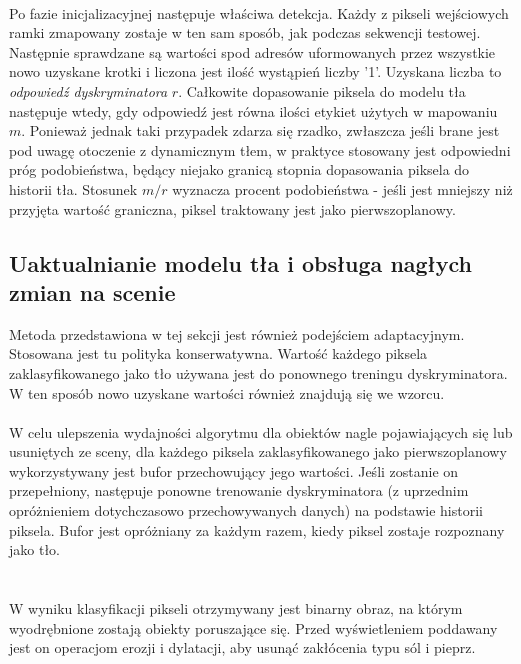 \paragraph{}
Po fazie inicjalizacyjnej następuje właściwa detekcja. Każdy z pikseli wejściowych ramki zmapowany zostaje w ten sam sposób, jak podczas sekwencji testowej. Następnie sprawdzane są wartości spod adresów uformowanych przez wszystkie nowo uzyskane krotki i liczona jest ilość wystąpień liczby '1'. Uzyskana liczba to \textit{odpowiedź dyskryminatora} $r$. Całkowite dopasowanie piksela do modelu tła następuje wtedy, gdy odpowiedź jest równa ilości etykiet użytych w mapowaniu $m$. Ponieważ jednak taki przypadek zdarza się rzadko, zwłaszcza jeśli brane jest pod uwagę otoczenie z dynamicznym tłem, w praktyce stosowany jest odpowiedni próg podobieństwa, będący niejako granicą stopnia dopasowania piksela do historii tła. Stosunek $m/r$ wyznacza procent podobieństwa - jeśli jest mniejszy niż przyjęta wartość graniczna, piksel traktowany jest jako pierwszoplanowy.
\subsection{Uaktualnianie modelu tła i obsługa nagłych zmian na scenie}
Metoda przedstawiona w tej sekcji jest również podejściem adaptacyjnym. Stosowana jest tu polityka konserwatywna. Wartość każdego piksela zaklasyfikowanego jako tło używana jest do ponownego treningu dyskryminatora. W ten sposób nowo uzyskane wartości również znajdują się we wzorcu.
\paragraph{}
W celu ulepszenia wydajności algorytmu dla obiektów nagle pojawiających się lub usuniętych ze sceny, dla każdego piksela zaklasyfikowanego jako pierwszoplanowy wykorzystywany jest bufor przechowujący jego wartości. Jeśli zostanie on przepełniony, następuje ponowne trenowanie dyskryminatora (z uprzednim opróżnieniem dotychczasowo przechowywanych danych) na podstawie historii piksela. Bufor jest opróżniany za każdym razem, kiedy piksel zostaje rozpoznany jako tło. \\ \\
\paragraph{}
W wyniku klasyfikacji pikseli otrzymywany jest binarny obraz, na którym wyodrębnione zostają obiekty poruszające się. Przed wyświetleniem poddawany jest on operacjom erozji i dylatacji, aby usunąć zakłócenia typu sól i pieprz.
